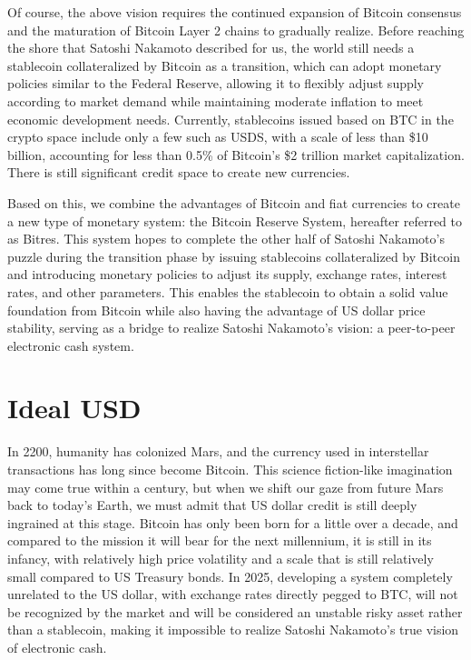 \documentclass{article}
\begin{document}
Of course, the above vision requires the continued expansion of Bitcoin consensus and the maturation of Bitcoin Layer 2 chains to gradually realize. Before reaching the shore that Satoshi Nakamoto described for us, the world still needs a stablecoin collateralized by Bitcoin as a transition, which can adopt monetary policies similar to the Federal Reserve, allowing it to flexibly adjust supply according to market demand while maintaining moderate inflation to meet economic development needs. Currently, stablecoins issued based on BTC in the crypto space include only a few such as USDS, with a scale of less than \$10 billion, accounting for less than 0.5\% of Bitcoin's \$2 trillion market capitalization. There is still significant credit space to create new currencies.

Based on this, we combine the advantages of Bitcoin and fiat currencies to create a new type of monetary system: the Bitcoin Reserve System, hereafter referred to as Bitres. This system hopes to complete the other half of Satoshi Nakamoto's puzzle during the transition phase by issuing stablecoins collateralized by Bitcoin and introducing monetary policies to adjust its supply, exchange rates, interest rates, and other parameters. This enables the stablecoin to obtain a solid value foundation from Bitcoin while also having the advantage of US dollar price stability, serving as a bridge to realize Satoshi Nakamoto's vision: a peer-to-peer electronic cash system.

\section{Ideal USD}

In 2200, humanity has colonized Mars, and the currency used in interstellar transactions has long since become Bitcoin. This science fiction-like imagination may come true within a century, but when we shift our gaze from future Mars back to today's Earth, we must admit that US dollar credit is still deeply ingrained at this stage. Bitcoin has only been born for a little over a decade, and compared to the mission it will bear for the next millennium, it is still in its infancy, with relatively high price volatility and a scale that is still relatively small compared to US Treasury bonds. In 2025, developing a system completely unrelated to the US dollar, with exchange rates directly pegged to BTC, will not be recognized by the market and will be considered an unstable risky asset rather than a stablecoin, making it impossible to realize Satoshi Nakamoto's true vision of electronic cash.
\end{document}
